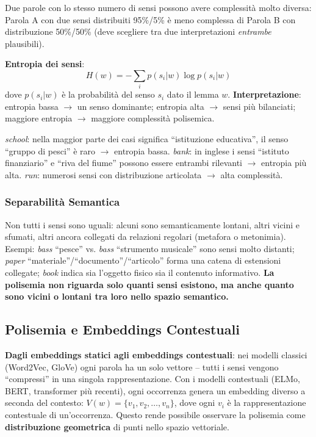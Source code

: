 \documentclass[12pt,a4paper]{article}
\begin{document}
Due parole con lo stesso numero di sensi possono avere complessit\`a molto diversa: Parola A con due sensi distribuiti 95\%/5\% \`e meno complessa di Parola B con distribuzione 50\%/50\% (deve scegliere tra due interpretazioni \emph{entrambe} plausibili).

\begin{formulabox}
\textbf{Entropia dei sensi}:
\[
H(w) = -\sum_i p(s_i|w)\log p(s_i|w)
\]
dove $p(s_i|w)$ \`e la probabilit\`a del senso $s_i$ dato il lemma $w$. \textbf{Interpretazione}: entropia bassa $\to$ un senso dominante; entropia alta $\to$ sensi pi\`u bilanciati; maggiore entropia $\to$ maggiore complessit\`a polisemica.
\end{formulabox}

\begin{examplebox}
\textit{school}: nella maggior parte dei casi significa ``istituzione educativa'', il senso ``gruppo di pesci'' \`e raro $\to$ entropia bassa. \textit{bank}: in inglese i sensi ``istituto finanziario'' e ``riva del fiume'' possono essere entrambi rilevanti $\to$ entropia pi\`u alta. \textit{run}: numerosi sensi con distribuzione articolata $\to$ alta complessit\`a.
\end{examplebox}

\subsubsection{Separabilit\`a Semantica}

Non tutti i sensi sono uguali: alcuni sono semanticamente lontani, altri vicini e sfumati, altri ancora collegati da relazioni regolari (metafora o metonimia). Esempi: \textit{bass} ``pesce'' vs. \textit{bass} ``strumento musicale'' sono sensi molto distanti; \textit{paper} ``materiale''/``documento''/``articolo'' forma una catena di estensioni collegate; \textit{book} indica sia l'oggetto fisico sia il contenuto informativo. \textbf{La polisemia non riguarda solo quanti sensi esistono, ma anche quanto sono vicini o lontani tra loro nello spazio semantico.}

\subsection{Polisemia e Embeddings Contestuali}

\textbf{Dagli embeddings statici agli embeddings contestuali}: nei modelli classici (Word2Vec, GloVe) ogni parola ha un solo vettore -- tutti i sensi vengono ``compressi'' in una singola rappresentazione. Con i modelli contestuali (ELMo, BERT, transformer pi\`u recenti), ogni occorrenza genera un embedding diverso a seconda del contesto: $V(w) = \{v_1, v_2, \dots, v_n\}$, dove ogni $v_i$ \`e la rappresentazione contestuale di un'occorrenza. Questo rende possibile osservare la polisemia come \textbf{distribuzione geometrica} di punti nello spazio vettoriale.
\end{document}
